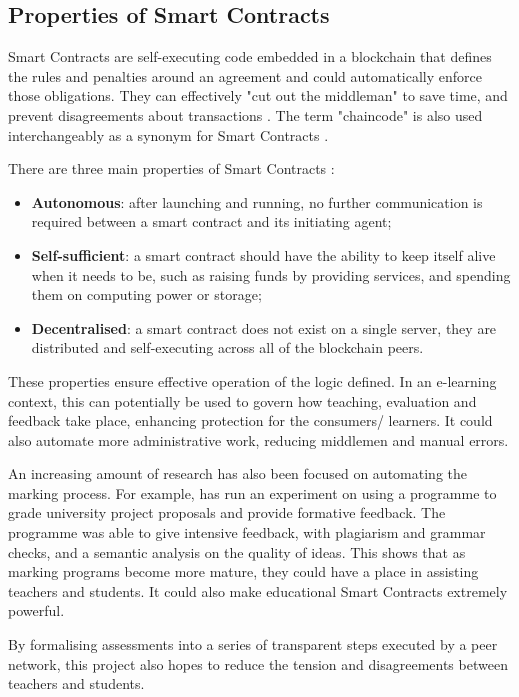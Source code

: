\subsection{Properties of Smart Contracts}
Smart Contracts are self-executing code embedded in a blockchain that defines the rules and penalties around an agreement and
could automatically enforce those obligations. They can effectively "cut out the middleman" to save time, and prevent disagreements
about transactions \citep{gulhane2017ibm}. The term "chaincode" is also used interchangeably as a synonym for
Smart Contracts \citep[p.6]{valenta2017comparison}.

There are three main properties of Smart Contracts \citep[p.16]{swan2015blockchain}:

\begin{itemize}
	\setlength\itemsep{0em}
	\item \textbf{Autonomous}: after launching and running, no further communication is required between a smart contract
	      and its initiating agent;
	\item \textbf{Self-sufficient}: a smart contract should have the ability to keep itself alive when it needs to be,
	      such as raising funds by providing services, and spending them on computing power or storage;
	\item \textbf{Decentralised}: a smart contract does not exist on a single server, they are distributed and self-executing
	      across all of the blockchain peers.
\end{itemize}

These properties ensure effective operation of the logic defined. In an e-learning context, this can potentially
be used to govern how teaching, evaluation and feedback take place, enhancing protection for the consumers/ learners. 
It could also automate more administrative work, reducing middlemen and manual errors.

An increasing amount of research has also been focused on automating the marking process. For example, \citet{al2012auto} has run 
an experiment on using a programme to grade university project proposals and provide formative feedback. The programme was 
able to give intensive feedback, with plagiarism and grammar checks, and a semantic analysis on the quality of ideas.
This shows that as marking programs become more mature, they could have a place in assisting teachers and students. 
It could also make educational Smart Contracts extremely powerful.

By formalising assessments into a series of transparent steps executed by a peer network, this project also hopes to 
reduce the tension and disagreements between teachers and students.

